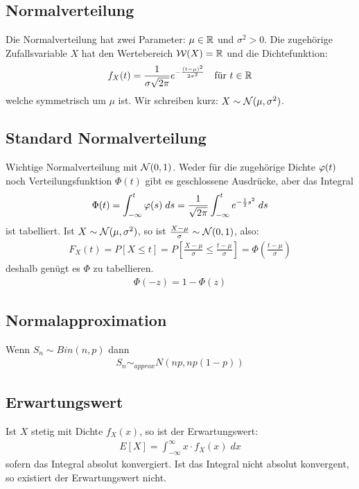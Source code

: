 \subsection*{Normalverteilung}
Die Normalverteilung hat zwei Parameter: $\mu \in \mathbb{R}$ und $\sigma^2 > 0$. Die
zugehörige Zufallsvariable $X$ hat den Wertebereich $\mathcal{W} (X) = \mathbb{R}$ und die
Dichtefunktion:
\begin{align*}
  f_X (t) = \frac{1}{\sigma \sqrt{2 \pi}} e^{- \frac{ (t - \mu)^2}{2 \sigma^2}}
   &  & \text{für } t \in \mathbb{R}
\end{align*}
welche symmetrisch um $\mu$ ist. Wir schreiben kurz: $X \sim \mathcal{N} (\mu, \sigma^2)$.
\subsection*{Standard Normalverteilung}
Wichtige Normalverteilung mit $\mathcal{N} (0, 1)$. Weder für die
zugehörige Dichte $\varphi (t)$ noch Verteilungsfunktion $\Phi (t)$ gibt es
geschlossene Ausdrücke, aber das Integral
\begin{align*}
  \Phi (t) = \int_{-\infty}^t \varphi (s) \; ds =
  \frac{1}{\sqrt{2\pi}} \int_{-\infty}^t e^{-\frac{1}{2} s^2} \; ds
\end{align*}
ist tabelliert. Ist $X \sim \mathcal{N} (\mu, \sigma^2)$, so ist
$\frac{X - \mu}{\sigma} \sim \mathcal{N} (0, 1)$, also:
\begin{align*}
  F_X (t) = P[X \leq t] = P \left[ \frac{X-\mu}{\sigma} \leq \frac{t - \mu}{\sigma} \right] = \Phi \left  ( \frac{t - \mu}{\sigma} \right)
\end{align*}
deshalb genügt es $\Phi$ zu tabellieren.
\begin{align*}
  \Phi (-z) = 1 - \Phi (z)
\end{align*}
\subsection*{Normalapproximation}
Wenn $S_n \sim Bin (n, p)$ dann
\begin{align*}
  S_n \sim_{approx} N (np, np (1-p))
\end{align*}
\subsection*{Erwartungswert}
Ist $X$ stetig mit Dichte $f_X (x)$, so ist der Erwartungswert:
\begin{align*}
  E[X] = \int_{-\infty}^\infty x \cdot f_X (x) \; dx
\end{align*}
sofern das Integral absolut konvergiert. Ist das Integral nicht
absolut konvergent, so existiert der Erwartungswert nicht.
